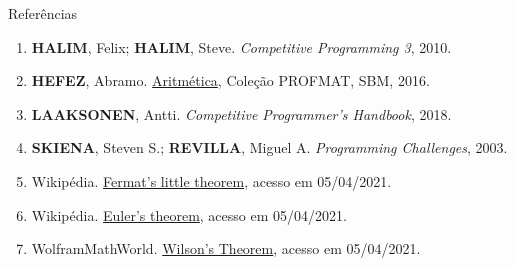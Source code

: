 \begin{frame}[fragile]{Referências}

    \begin{enumerate}
        \item \textbf{HALIM}, Felix; \textbf{HALIM}, Steve. \textit{Competitive Programming 3}, 2010.

        \item \textbf{HEFEZ}, Abramo. \href{https://loja.sbm.org.br/index.php/aritmetica.html}{Aritmética}, Coleção PROFMAT, SBM, 2016.

        \item \textbf{LAAKSONEN}, Antti. \textit{Competitive Programmer's Handbook}, 2018.

        \item \textbf{SKIENA}, Steven S.; \textbf{REVILLA}, Miguel A. \textit{Programming 
            Challenges}, 2003.

        \item Wikipédia. \href{https://en.wikipedia.org/wiki/Fermat%27s_little_theorem}{Fermat's little theorem}, acesso em 05/04/2021.
 
        \item Wikipédia. \href{https://en.wikipedia.org/wiki/Euler%27s_theorem}{Euler's theorem}, acesso em 05/04/2021.

        \item WolframMathWorld. \href{https://mathworld.wolfram.com/WilsonsTheorem.html}{Wilson's Theorem}, acesso em 05/04/2021.

   \end{enumerate}

\end{frame}
